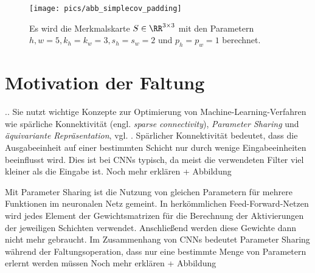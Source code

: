 \begin{figure}[h]
    \texttt{[image: pics/abb\_simplecov\_padding]}
    \centering
    \caption{Es wird die Merkmalskarte $S \in \RR^{3 \times 3}$ mit den Parametern ${h,w=5}, k_h=k_w=3, s_h=s_w=2$ und $p_h=p_w=1$ berechnet.}
    \label{abb_simplematrixconv_padding}
\end{figure}



\section{Motivation der Faltung}
..
Sie nutzt wichtige Konzepte zur Optimierung von Machine-Learning-Verfahren wie spärliche Konnektivität (engl. \textit{sparse connectivity}), \textit{Parameter Sharing} und \textit{äquivariante Repräsentation}, vgl. \cite{goodfellow}. Spärlicher Konnektivität bedeutet, dass die Ausgabeeinheit auf einer bestimmten Schicht nur durch wenige Eingabeeinheiten beeinflusst wird. Dies ist bei CNNs typisch, da meist die verwendeten Filter viel kleiner als die Eingabe ist. Noch mehr erklären + Abbildung

Mit Parameter Sharing ist die Nutzung von gleichen Parametern für mehrere Funktionen im neuronalen Netz gemeint. In herkömmlichen Feed-Forward-Netzen wird jedes Element der Gewichtsmatrizen für die Berechnung der Aktivierungen der jeweiligen Schichten verwendet. Anschließend werden diese Gewichte dann nicht mehr gebraucht. Im Zusammenhang von CNNs bedeutet Parameter Sharing während der Faltungsoperation, dass nur eine bestimmte Menge von Parametern erlernt werden müssen
Noch mehr erklären + Abbildung

